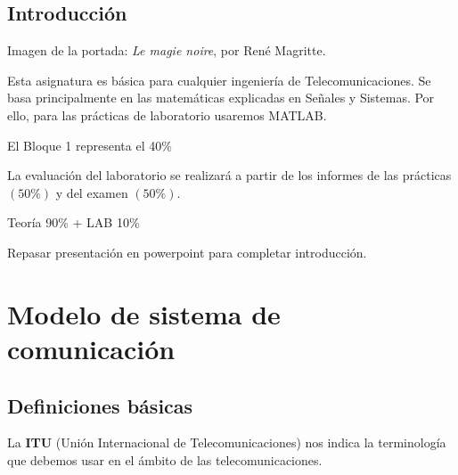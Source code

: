 \documentclass[a4paper]{book}
\begin{document}
\newpage
{}
{}
\section*{Introducción}
Imagen de la portada: \textsl{Le magie noire}, por René Magritte.

Esta asignatura es básica para cualquier ingeniería de Telecomunicaciones. Se basa principalmente en las matemáticas explicadas en Señales y Sistemas. Por ello, para las prácticas de laboratorio usaremos MATLAB.

El Bloque 1 representa el 40\%

La evaluación del laboratorio se realizará a partir de los informes de las prácticas $(50\% )$ y del examen $(50\% )$.

Teoría 90\% + LAB 10\%

Repasar presentación en powerpoint para completar introducción.

\newpage

\setlength{\parskip}{0em}
\tableofcontents 
\setlength{\parskip}{0.5em}

\chapter{Modelo de sistema de comunicación}

\section{Definiciones básicas}

La \textbf{ITU} (Unión Internacional de Telecomunicaciones) nos indica la terminología que debemos usar en el ámbito de las telecomunicaciones.
\end{document}
